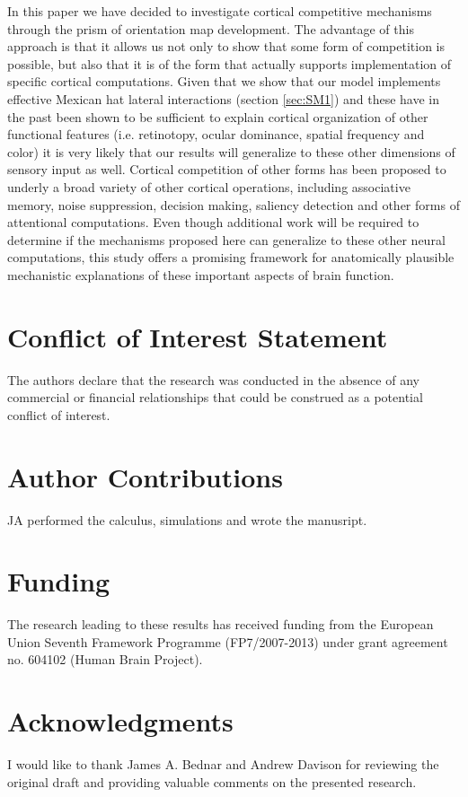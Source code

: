 \documentclass[utf8]{frontiersSCNS}
\begin{document}
In this paper we have decided to investigate cortical competitive mechanisms through the prism of orientation map development. The advantage of this approach is that it allows us not only to show that some form 
of competition is possible, but also that it is of the form that actually supports implementation of specific cortical computations. Given that we show that our model implements effective Mexican hat lateral 
interactions (section \ref{sec:SM1}) and these have in the past been shown to be sufficient to explain cortical organization of other functional features (i.e. retinotopy, ocular dominance, spatial frequency and color) 
it is very likely that our results will generalize to these other dimensions of sensory input as well. Cortical competition of other forms has been proposed to underly a broad variety of other cortical operations, 
including associative memory, noise suppression, decision making, saliency detection and other forms of attentional computations. Even though additional work will be required to determine if the mechanisms proposed 
here can generalize to these other neural computations, this study offers a promising framework for anatomically plausible mechanistic explanations of these important aspects of brain function.


\section*{Conflict of Interest Statement}

The authors declare that the research was conducted in the absence of any commercial or financial relationships that could be construed as a potential conflict of interest.

\section*{Author Contributions}

JA performed the calculus, simulations and wrote the manusript.

\section*{Funding}
The research leading to these results has received funding from the European Union Seventh Framework Programme (FP7/2007-2013) under grant
agreement no. 604102 (Human Brain Project).

\section*{Acknowledgments}
I would like to thank James A. Bednar and Andrew Davison for reviewing the original draft and 
providing valuable comments on the presented research.




\end{document}
